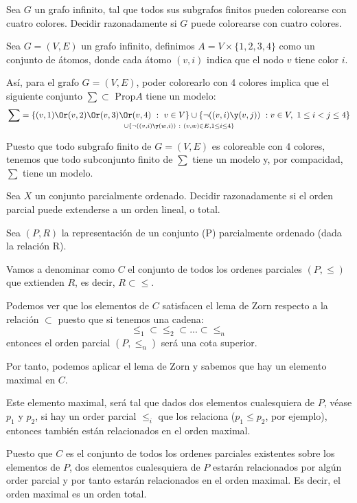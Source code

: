 \begin{problem}[4]
Sea $G$ un grafo infinito, tal que todos sus subgrafos finitos pueden colorearse con cuatro colores.
Decidir razonadamente si $G$ puede colorearse con cuatro colores.
\solution

Sea $G=(V,E)$ un grafo infinito, definimos $A=V \times \{1,2,3,4\}$ como un conjunto de átomos, donde cada átomo $(v,i)$ indica que el nodo $v$ tiene color $i$.

Así, para el grafo $G=(V,E)$, poder colorearlo con 4 colores implica que el siguiente conjunto $\sum \subset \text{ Prop} A$ tiene un modelo:
\[\sum = \{(v,1)\Or (v,2) \Or (v,3) \Or (v,4) \ : \ v \in V\} \cup \{\neg((v,i)\y(v,j)) \ : v \in V, \ 1 \leq i < j \leq 4\}\atop \cup \{\neg((v,i)\y (w,i)) \ : \ (v,w) \in E,  1 \leq i \leq 4\}\]

Puesto que todo subgrafo finito de $G=(V,E)$ es coloreable con 4 colores, tenemos que todo subconjunto finito de $\sum$ tiene un modelo y, por compacidad, $\sum$ tiene un modelo.

\end{problem}

\begin{problem}[5]
Sea $X$ un conjunto parcialmente ordenado. Decidir razonadamente si el orden parcial puede
extenderse a un orden lineal, o total.
\solution


Sea $(P,R)$ la representación de un conjunto (P) parcialmente ordenado (dada la relación R).

Vamos a denominar como $C$ el conjunto de todos los ordenes parciales $(P,\leq)$ que extienden $R$, es decir, $R \subset \leq$.

Podemos ver que los elementos de $C$ satisfacen el lema de Zorn respecto a la relación $\subset$ puesto que si tenemos una cadena:
\[\leq_1 \subset \leq_2 \subset ... \subset \leq_n\]
entonces el orden parcial $(P,\leq_n)$ será una cota superior.

Por tanto, podemos aplicar el lema de Zorn y sabemos que hay un elemento maximal en $C$.

Este elemento maximal, será tal que dados dos elementos cualesquiera de $P$, véase $p_1$ y $p_2$, si hay un order parcial $\leq_i$ que los relaciona ($p_1 \leq p_2$, por ejemplo), entonces también están relacionados en el orden maximal.

Puesto que $C$ es el conjunto de todos los ordenes parciales existentes sobre los elementos de $P$, dos elementos cualesquiera de $P$ estarán relacionados por algún order parcial y por tanto estarán relacionados en el orden maximal. Es decir, el orden maximal es un orden total.
\end{problem}

